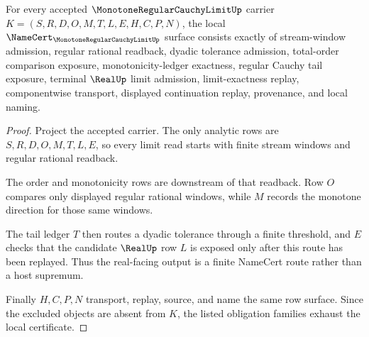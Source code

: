 \begin{theorem}
\label{thm:monotone-regular-cauchy-limit-namecert-obligations}
For every accepted $\MonotoneRegularCauchyLimitUp$ carrier $K=(S,R,D,O,M,T,L,E,H,C,P,N)$, the local $\NameCert_{\MonotoneRegularCauchyLimitUp}$ surface consists exactly of stream-window admission, regular rational readback, dyadic tolerance admission, total-order comparison exposure, monotonicity-ledger exactness, regular Cauchy tail exposure, terminal $\RealUp$ limit admission, limit-exactness replay, componentwise transport, displayed continuation replay, provenance, and local naming.
\end{theorem}
\begin{proof}
Project the accepted carrier. The only analytic rows are $S,R,D,O,M,T,L,E$, so every limit read starts with finite stream windows and regular rational readback.

The order and monotonicity rows are downstream of that readback. Row $O$ compares only displayed regular rational windows, while $M$ records the monotone direction for those same windows.

The tail ledger $T$ then routes a dyadic tolerance through a finite threshold, and $E$ checks that the candidate $\RealUp$ row $L$ is exposed only after this route has been replayed. Thus the real-facing output is a finite NameCert route rather than a host supremum.

Finally $H,C,P,N$ transport, replay, source, and name the same row surface. Since the excluded objects are absent from $K$, the listed obligation families exhaust the local certificate.
\end{proof}

